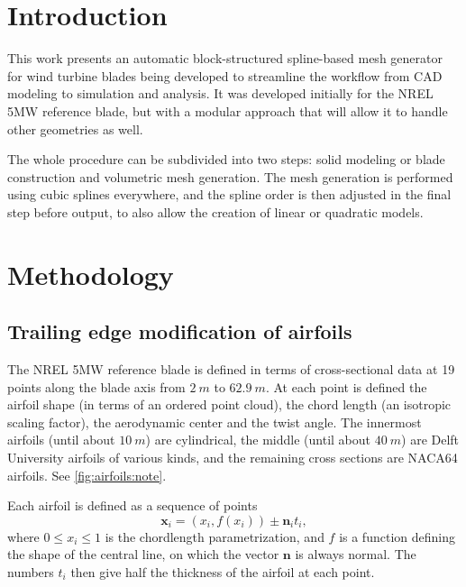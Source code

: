 \documentclass[3p,times,procedia]{elsarticle}
\begin{document}
\section{Introduction}

This work presents an automatic block-structured spline-based mesh generator for
wind turbine blades being developed to streamline the workflow from CAD modeling
to simulation and analysis. It was developed initially for the NREL 5MW
reference blade, but with a modular approach that will allow it to handle other
geometries as well.

The whole procedure can be subdivided into two steps: solid modeling or blade
construction and volumetric mesh generation. The mesh generation is performed
using cubic splines everywhere, and the spline order is then adjusted in the
final step before output, to also allow the creation of linear or quadratic
models.

\section{Methodology}

\subsection{Trailing edge modification of airfoils}

The NREL 5MW reference blade \cite{Jonkman2009drw} is defined in terms of
cross-sectional data at 19 points along the blade axis from $\SI{2}{m}$ to
$\SI{62.9}{m}$. At each point is defined the airfoil shape (in terms of an
ordered point cloud), the chord length (an isotropic scaling factor), the
aerodynamic center and the twist angle. The innermost airfoils (until about
$\SI{10}{m}$) are cylindrical, the middle (until about $\SI{40}{m}$) are Delft
University airfoils of various kinds, and the remaining cross sections are
NACA64 airfoils. See \autoref{fig:airfoils:note}.

Each airfoil is defined as a sequence of points
\[ \bm{x}_i = (x_i, f(x_i)) \pm \bm{n}_i t_i, \] where $0 \le x_i \le 1$ is the
chordlength parametrization, and $f$ is a function defining the shape of the
central line, on which the vector $\bm{n}$ is always normal. The numbers $t_i$
then give half the thickness of the airfoil at each point.
\end{document}
